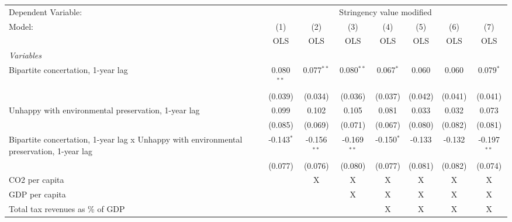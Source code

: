 
\begingroup
\centering
\begin{tabular}{lccccccc}
   \toprule
   Dependent Variable: & \multicolumn{7}{c}{Stringency value modified}\\
   Model:                                                                                   & (1)          & (2)           & (3)           & (4)          & (5)     & (6)     & (7)\\  
                                                                                            &  OLS         & OLS           & OLS           & OLS          & OLS     & OLS     & OLS\\  
   \midrule
   \emph{Variables}\\
   Bipartite concertation, 1-year lag                                                       & 0.080$^{**}$ & 0.077$^{**}$  & 0.080$^{**}$  & 0.067$^{*}$  & 0.060   & 0.060   & 0.079$^{*}$\\   
                                                                                            & (0.039)      & (0.034)       & (0.036)       & (0.037)      & (0.042) & (0.041) & (0.041)\\   
   Unhappy with environmental preservation, 1-year lag                                      & 0.099        & 0.102         & 0.105         & 0.081        & 0.033   & 0.032   & 0.073\\   
                                                                                            & (0.085)      & (0.069)       & (0.071)       & (0.067)      & (0.080) & (0.082) & (0.081)\\   
   Bipartite concertation, 1-year lag x Unhappy with environmental preservation, 1-year lag & -0.143$^{*}$ & -0.156$^{**}$ & -0.169$^{**}$ & -0.150$^{*}$ & -0.133  & -0.132  & -0.197$^{**}$\\   
                                                                                            & (0.077)      & (0.076)       & (0.080)       & (0.077)      & (0.081) & (0.082) & (0.074)\\   
   CO2 per capita                                                                           &              & X             & X             & X            & X       & X       & X\\  
   GDP per capita                                                                           &              &               & X             & X            & X       & X       & X\\  
   Total tax revenues as \% of GDP                                                          &              &               &               & X            & X       & X       & X\\  

\end{tabular}

